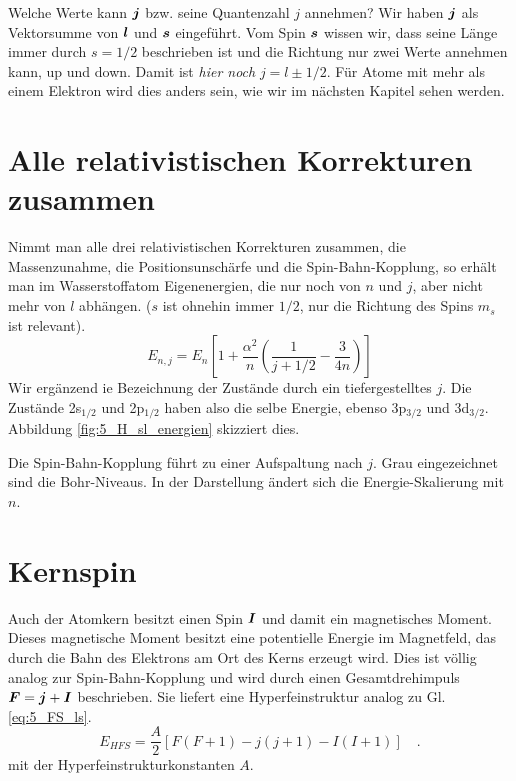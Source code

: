 Welche Werte kann $\boldsymbol{j}$ bzw. seine Quantenzahl $j$ annehmen? Wir haben $\boldsymbol{j}$ als Vektorsumme von $\boldsymbol{l}$ und $\boldsymbol{s}$ eingeführt. Vom Spin $\boldsymbol{s}$ wissen wir, dass seine Länge immer durch $s=1/2$ beschrieben ist und die Richtung nur zwei Werte annehmen kann, up und down. Damit ist \emph{hier noch} $j = l \pm 1/2$. Für Atome mit mehr als einem Elektron wird dies anders sein, wie wir im nächsten Kapitel sehen werden.


\section{Alle relativistischen Korrekturen zusammen}

Nimmt man alle drei relativistischen Korrekturen zusammen, die Massenzunahme, die Positionsunschärfe und die Spin-Bahn-Kopplung, so erhält man im Wasserstoffatom Eigenenergien, die nur noch von $n$ und $j$, aber nicht mehr von $l$ abhängen. ($s$ ist ohnehin immer $1/2$, nur die Richtung des Spins $m_s$ ist relevant).
\begin{equation}
    E_{n,j} = E_n \left[ 1 + \frac{\alpha^2}{n} \left( \frac{1}{j + 1/2} - \frac{3}{4n} \right) \right]
\end{equation}
Wir ergänzend ie Bezeichnung der   Zustände durch ein tiefergestelltes $j$. Die Zustände 2s$_{1/2}$ und 2p$_{1/2}$ haben also die selbe Energie, ebenso  3p$_{3/2}$ und 3d$_{3/2}$. Abbildung \ref{fig:5_H_sl_energien} skizziert dies.

\begin{marginfigure}
    \caption{Die Spin-Bahn-Kopplung führt zu einer Aufspaltung nach $j$. Grau eingezeichnet sind die Bohr-Niveaus. In der Darstellung ändert sich die Energie-Skalierung mit $n$.}
    \label{fig:5_H_sl_energien}
\end{marginfigure} 



\section{Kernspin}

Auch der Atomkern besitzt einen Spin $\boldsymbol{I}$ und damit ein magnetisches Moment. Dieses magnetische Moment besitzt eine potentielle Energie im Magnetfeld, das durch die Bahn des Elektrons am Ort des Kerns erzeugt wird. Dies ist völlig analog zur Spin-Bahn-Kopplung und wird durch einen Gesamtdrehimpuls $\boldsymbol{F} = \boldsymbol{j} + \boldsymbol{I}$ beschrieben. Sie liefert eine Hyperfeinstruktur analog zu Gl. \ref{eq:5_FS_ls}.
\begin{equation}
    E_{HFS}     = \frac{A}{2}  \left[ F(F+1) - j(j+1) - I(I+1) \right] \quad . 
\end{equation}
mit der Hyperfeinstrukturkonstanten $A$.



